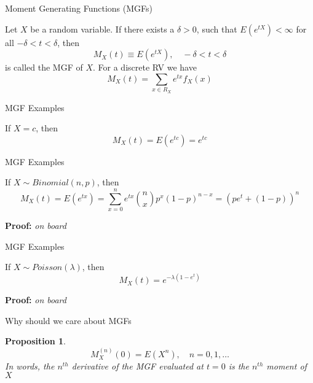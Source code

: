 \documentclass[12pt,ignorenonframetext,compress]{beamer}
\newtheorem{proposition}[theorem]{Proposition}
\begin{document}
\begin{frame}{Moment Generating Functions (MGFs)}

\begin{definition}[MGFs]
Let $X$ be a random variable. If there exists a $\delta >0$, such that $E(e^{tX}) < \infty$ for all $-\delta < t < \delta$, then
\[M_X(t) \equiv E(e^{tX}), \quad -\delta < t < \delta\]
is called the MGF of $X$. For a discrete RV we have
\pause
\[M_X(t) = \sum_{x \in R_X} e^{tx} f_X(x)\]
\end{definition}

\end{frame}

\begin{frame}{MGF Examples}

\begin{example}[Constant]
If $X=c$, then \[M_X(t) = E(e^{tc}) = e^{tc}\]

\end{example}

\end{frame}

\begin{frame}{MGF Examples}

\begin{example}[Binomial]
If $X\sim Binomial(n, p)$, then \[M_X(t) = E(e^{tx}) = \sum_{x=0}^{n}e^{tx} \binom{n}{x} p^x (1-p)^{n-x} = (pe^t + (1-p))^n\]



\end{example}

\textbf{Proof:} \emph{on board}

\end{frame}

\begin{frame}{MGF Examples}

\begin{example}[Poisson]
If $X\sim Poisson(\lambda)$, then \[M_X(t) = e^{-\lambda(1-e^t)} \]

\end{example}

\textbf{Proof:} \emph{on board}

\end{frame}

\begin{frame}{Why should we care about MGFs}

\begin{proposition}
\[M_X^{(n)}(0) = E(X^n), \quad n=0,1,\ldots\]
In words, the $n^{th}$ derivative of the MGF evaluated at $t=0$ is the $n^{th}$ moment of $X$
\end{proposition}

\end{frame}
\end{document}
